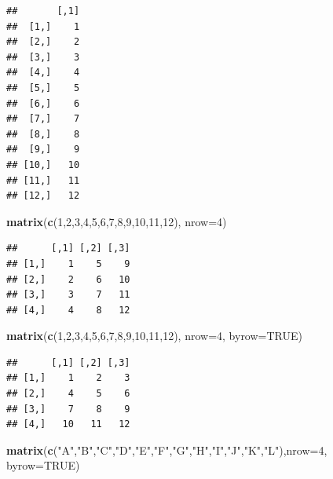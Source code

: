 \documentclass[a4paper]{book}
\newenvironment{Shaded}{\begin{snugshade}}{\end{snugshade}}
\newcommand{\KeywordTok}[1]{\textcolor[rgb]{0.13,0.29,0.53}{\textbf{{#1}}}}
\newcommand{\DataTypeTok}[1]{\textcolor[rgb]{0.13,0.29,0.53}{{#1}}}
\newcommand{\DecValTok}[1]{\textcolor[rgb]{0.00,0.00,0.81}{{#1}}}
\newcommand{\StringTok}[1]{\textcolor[rgb]{0.31,0.60,0.02}{{#1}}}
\newcommand{\OtherTok}[1]{\textcolor[rgb]{0.56,0.35,0.01}{{#1}}}
\newcommand{\NormalTok}[1]{{#1}}
\renewenvironment{Shaded}
{\vspace{1.5em}\begin{leftbar}\begin{snugshade}}
{\end{snugshade}\end{leftbar}\vspace{3pt}}
\begin{document}
\begin{verbatim}
##       [,1]
##  [1,]    1
##  [2,]    2
##  [3,]    3
##  [4,]    4
##  [5,]    5
##  [6,]    6
##  [7,]    7
##  [8,]    8
##  [9,]    9
## [10,]   10
## [11,]   11
## [12,]   12
\end{verbatim}

\begin{Shaded}
\begin{Highlighting}[]
\KeywordTok{matrix}\NormalTok{(}\KeywordTok{c}\NormalTok{(}\DecValTok{1}\NormalTok{,}\DecValTok{2}\NormalTok{,}\DecValTok{3}\NormalTok{,}\DecValTok{4}\NormalTok{,}\DecValTok{5}\NormalTok{,}\DecValTok{6}\NormalTok{,}\DecValTok{7}\NormalTok{,}\DecValTok{8}\NormalTok{,}\DecValTok{9}\NormalTok{,}\DecValTok{10}\NormalTok{,}\DecValTok{11}\NormalTok{,}\DecValTok{12}\NormalTok{), }\DataTypeTok{nrow=}\DecValTok{4}\NormalTok{)}
\end{Highlighting}
\end{Shaded}

\begin{verbatim}
##      [,1] [,2] [,3]
## [1,]    1    5    9
## [2,]    2    6   10
## [3,]    3    7   11
## [4,]    4    8   12
\end{verbatim}

\begin{Shaded}
\begin{Highlighting}[]
\KeywordTok{matrix}\NormalTok{(}\KeywordTok{c}\NormalTok{(}\DecValTok{1}\NormalTok{,}\DecValTok{2}\NormalTok{,}\DecValTok{3}\NormalTok{,}\DecValTok{4}\NormalTok{,}\DecValTok{5}\NormalTok{,}\DecValTok{6}\NormalTok{,}\DecValTok{7}\NormalTok{,}\DecValTok{8}\NormalTok{,}\DecValTok{9}\NormalTok{,}\DecValTok{10}\NormalTok{,}\DecValTok{11}\NormalTok{,}\DecValTok{12}\NormalTok{), }\DataTypeTok{nrow=}\DecValTok{4}\NormalTok{, }\DataTypeTok{byrow=}\OtherTok{TRUE}\NormalTok{)}
\end{Highlighting}
\end{Shaded}

\begin{verbatim}
##      [,1] [,2] [,3]
## [1,]    1    2    3
## [2,]    4    5    6
## [3,]    7    8    9
## [4,]   10   11   12
\end{verbatim}

\begin{Shaded}
\begin{Highlighting}[]
\KeywordTok{matrix}\NormalTok{(}\KeywordTok{c}\NormalTok{(}\StringTok{"A"}\NormalTok{,}\StringTok{"B"}\NormalTok{,}\StringTok{"C"}\NormalTok{,}\StringTok{"D"}\NormalTok{,}\StringTok{"E"}\NormalTok{,}\StringTok{"F"}\NormalTok{,}\StringTok{"G"}\NormalTok{,}\StringTok{"H"}\NormalTok{,}\StringTok{"I"}\NormalTok{,}\StringTok{"J"}\NormalTok{,}\StringTok{"K"}\NormalTok{,}\StringTok{"L"}\NormalTok{),}\DataTypeTok{nrow=}\DecValTok{4}\NormalTok{, }\DataTypeTok{byrow=}\OtherTok{TRUE}\NormalTok{)}
\end{Highlighting}
\end{Shaded}
\end{document}
